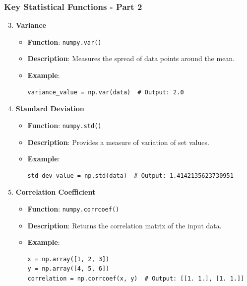 \documentclass{beamer}
\begin{document}
\begin{frame}[fragile]
    \frametitle{Key Statistical Functions - Part 2}
    \begin{enumerate}
        \setcounter{enumi}{2} %
        \item \textbf{Variance}
        \begin{itemize}
            \item \textbf{Function}: \texttt{numpy.var()}
            \item \textbf{Description}: Measures the spread of data points around the mean.
            \item \textbf{Example}:
            \begin{lstlisting}
variance_value = np.var(data)  # Output: 2.0
            \end{lstlisting}
        \end{itemize}
        
        \item \textbf{Standard Deviation}
        \begin{itemize}
            \item \textbf{Function}: \texttt{numpy.std()}
            \item \textbf{Description}: Provides a measure of variation of set values.
            \item \textbf{Example}:
            \begin{lstlisting}
std_dev_value = np.std(data)  # Output: 1.4142135623730951
            \end{lstlisting}
        \end{itemize}
        
        \item \textbf{Correlation Coefficient}
        \begin{itemize}
            \item \textbf{Function}: \texttt{numpy.corrcoef()}
            \item \textbf{Description}: Returns the correlation matrix of the input data.
            \item \textbf{Example}:
            \begin{lstlisting}
x = np.array([1, 2, 3])
y = np.array([4, 5, 6])
correlation = np.corrcoef(x, y)  # Output: [[1. 1.], [1. 1.]]
            \end{lstlisting}
        \end{itemize}
    \end{enumerate}
\end{frame}
\end{document}
